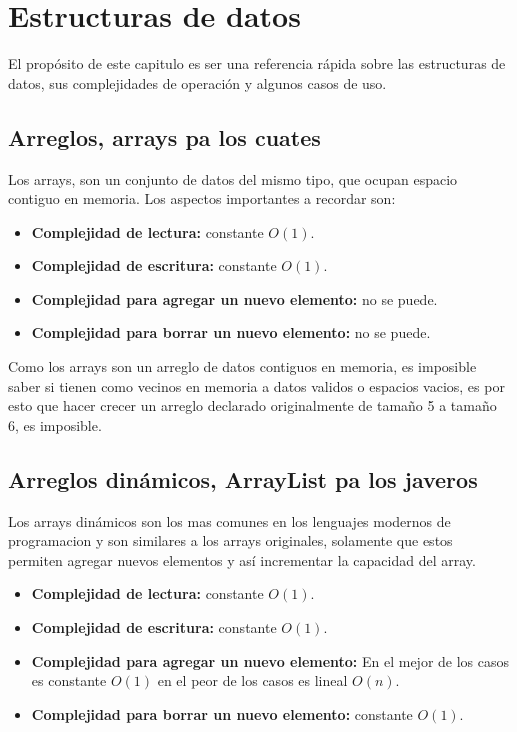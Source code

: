 \chapter{Estructuras de datos}

El propósito de este capitulo es ser una referencia rápida sobre las estructuras de datos, sus complejidades de operación y algunos casos de uso. 

\section{Arreglos, arrays pa los cuates}

Los arrays, son un conjunto de datos del mismo tipo, que ocupan espacio contiguo en memoria. Los aspectos importantes a recordar son:

\begin{itemize}
    \item \textbf{Complejidad de lectura:} constante $O(1)$.
    \item \textbf{Complejidad de escritura:} constante $O(1)$.
    \item \textbf{Complejidad para agregar un nuevo elemento:} no se puede.
    \item \textbf{Complejidad para borrar un nuevo elemento:} no se puede.
\end{itemize}

Como los arrays son un arreglo de datos contiguos en memoria, es imposible saber si tienen como vecinos en memoria a datos validos o espacios vacios, es por esto que hacer crecer un arreglo declarado originalmente de tamaño 5 a tamaño 6, es imposible.

\section{Arreglos dinámicos, ArrayList pa los javeros}

Los arrays dinámicos son los mas comunes en los lenguajes modernos de programacion y son similares a los arrays originales, solamente que estos permiten agregar nuevos elementos y así incrementar la capacidad del array.

\begin{itemize}
    \item \textbf{Complejidad de lectura:} constante $O(1)$.
    \item \textbf{Complejidad de escritura:} constante $O(1)$.
    \item \textbf{Complejidad para agregar un nuevo elemento:} En el mejor de los casos es constante $O(1)$ en el peor de los casos es lineal $O(n)$.
    \item \textbf{Complejidad para borrar un nuevo elemento:} constante $O(1)$.
\end{itemize}

